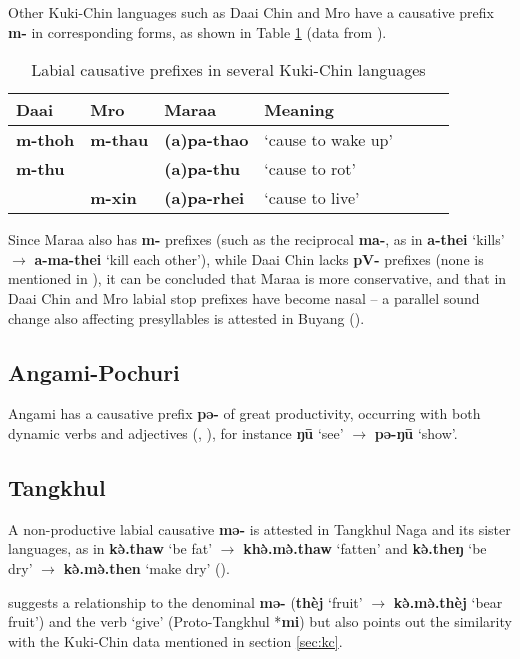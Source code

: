 \documentclass[oneside,a4paper,11pt]{article}
\newcommand{\ipa}[1]{\textbf{{\phon\mbox{#1}}}} %
\newcommand{\forme}[2]{\ipa{#1} `#2'}
\begin{document}
Other Kuki-Chin languages such as Daai Chin and Mro have a causative prefix \ipa{m-} in corresponding forms, as shown in Table \ref{tab:kukichin}  (data from \citealt[139]{hartmann01prenasalization}).

\begin{table}[H]
\caption{Labial causative prefixes in several Kuki-Chin languages} \centering \label{tab:kukichin}
\begin{tabular}{lllllll}
\toprule
Daai & Mro & Maraa & Meaning \\
\midrule
\ipa{m-thoh}  &\ipa{m-thau}  & \ipa{(a)pa-thao} & `cause to wake up' \\
\ipa{m-thu}  &  & \ipa{(a)pa-thu} & `cause to rot' \\
&\ipa{m-xin}  & \ipa{(a)pa-rhei} & `cause to live' \\
\bottomrule
\end{tabular}
\end{table}

Since Maraa also has \ipa{m-} prefixes (such as the reciprocal \ipa{ma-}, as in \forme{a-thei}{kills} $\rightarrow$ \forme{a-ma-thei}{kill each other}), while Daai Chin lacks \ipa{pV-} prefixes (none is mentioned in \citealt{hartmann09grammar}), it can be concluded that Maraa is more conservative, and that in Daai Chin and Mro labial stop prefixes have become nasal -- a parallel sound change also affecting presyllables is attested in Buyang (\citealt{jacques17buyang}).

\subsection{Angami-Pochuri}
Angami has a causative prefix \ipa{pə-} of great productivity, occurring with both dynamic verbs and adjectives (\citealt[132-3]{matisoff03}, \citealt[66-67]{giridhar80angami}), for instance \forme{ŋū}{see} $\rightarrow$ \forme{pə-ŋū}{show}.

\subsection{Tangkhul} \label{sec:tangkhul}
A non-productive labial causative \ipa{mə-} is attested in Tangkhul Naga and its sister languages, as in \forme{kə̀.thaw}{be fat} $\rightarrow$ \forme{khə̀.mə̀.thaw}{fatten} and \forme{kə̀.theŋ}{be dry}  $\rightarrow$ \forme{kə̀.mə̀.then}{make dry}  (\citealt[23]{mortensen03tangkhul}). 

\citet[23]{mortensen03tangkhul} suggests a relationship to the denominal \ipa{mə-} (\forme{thèj}{fruit}  $\rightarrow$ \forme{kə̀.mə̀.thèj}{bear fruit}) and the verb `give' (Proto-Tangkhul *\ipa{mi}) but also points out the similarity with the Kuki-Chin data mentioned in section \ref{sec:kc}.
 
\end{document}
